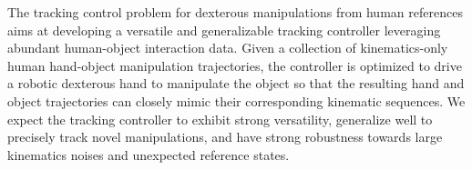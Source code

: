 The tracking control problem for dexterous manipulations from human references aims at developing a versatile and generalizable tracking controller leveraging abundant human-object interaction data. 
Given a collection of kinematics-only human hand-object manipulation trajectories, the controller is optimized to drive a robotic dexterous hand to manipulate the object so that the resulting hand and object trajectories can closely mimic their corresponding kinematic sequences. 
We expect the tracking controller to exhibit strong versatility, generalize well to precisely track novel manipulations, and have strong robustness towards large kinematics noises and unexpected reference states. 




